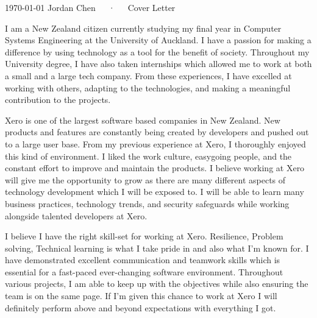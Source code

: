 \documentclass[11pt, a4paper]{awesome-cv}
\begin{document}
\makecvheader[L]

\makecvfooter
  {\today}
  {Jordan Chen~~~·~~~Cover Letter}
  {}

\makelettertitle

\begin{cvletter}

I am a New Zealand citizen currently studying my final year in Computer Systems Engineering at the University of Auckland. I have a passion for making a difference by using technology as a tool for the benefit of society. Throughout my University degree, I have also taken internships which allowed me to work at both a small and a large tech company. From these experiences, I have excelled at working with others, adapting to the technologies, and making a meaningful contribution to the projects.

Xero is one of the largest software based companies in New Zealand. New products and features are constantly being created by developers and pushed out to a large user base. From my previous experience at Xero, I thoroughly enjoyed this kind of environment. I liked the work culture, easygoing people, and the constant effort to improve and maintain the products. I believe working at Xero will give me the opportunity to grow as there are many different aspects of technology development which I will be exposed to. I will be able to learn many business practices, technology trends, and security safeguards while working alongside talented developers at Xero.

I believe I have the right skill-set for working at Xero. Resilience, Problem solving, Technical learning is what I take pride in and also what I'm known for. I have demonstrated excellent communication and teamwork skills which is essential for a fast-paced ever-changing software environment. Throughout various projects, I am able to keep up with the objectives while also ensuring the team is on the same page. If I'm given this chance to work at Xero I will definitely perform above and beyond expectations with everything I got.

\end{cvletter}


\makeletterclosing
\end{document}
